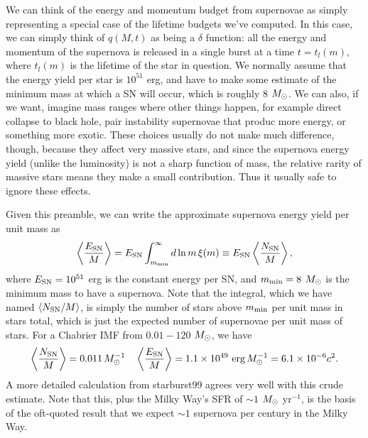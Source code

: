 We can think of the energy and momentum budget from supernovae as simply representing a special case of the lifetime budgets we've computed. In this case, we can simply think of $q(M,t)$ as being a $\delta$ function: all the energy and momentum of the supernova is released in a single burst at a time $t=t_l(m)$, where $t_l(m)$ is the lifetime of the star in question. We normally assume that the energy yield per star is $10^{51}$ erg, and have to make some estimate of the minimum mass at which a SN will occur, which is roughly 8 $M_{\odot}$. We can also, if we want, imagine mass ranges where other things happen, for example direct collapse to black hole, pair instability supernovae that produc more energy, or something more exotic. These choices usually do not make much difference, though, because they affect very massive stars, and since the supernova energy yield (unlike the luminosity) is not a sharp function of mass, the relative rarity of massive stars means they make a small contribution. Thus it usually safe to ignore these effects.

Given this preamble, we can write the approximate supernova energy yield per unit mass as
\begin{equation}
\left\langle \frac{E_{\rm SN}}{M}\right\rangle = E_{\rm SN} \int_{m_{\rm min}}^\infty d\ln m\, \xi(m) \equiv E_{\rm SN} \left\langle \frac{N_{\rm SN}}{M}\right\rangle,
\end{equation}
where $E_{\rm SN} = 10^{51}$ erg is the constant energy per SN, and $m_{\rm min} = 8$ $M_{\odot}$ is the minimum mass to have a supernova. Note that the integral, which we have named $\langle N_{\rm SN}/M\rangle$, is simply the number of stars above $m_{\rm min}$ per unit mass in stars total, which is just the expected number of supernovae per unit mass of stars. For a Chabrier IMF from $0.01-120$ $M_{\odot}$, we have
\begin{equation}
\left\langle \frac{N_{\rm SN}}{M}\right\rangle = 0.011\, M_{\odot}^{-1}
\quad
\left\langle \frac{E_{\rm SN}}{M}\right\rangle = 1.1\times 10^{49}\mbox{ erg}\,M_{\odot}^{-1}=6.1\times 10^{-6} c^2.
\end{equation}
A more detailed calculation from starburst99 agrees very well with this crude estimate. Note that this, plus the Milky Way's SFR of $\sim 1$ $M_{\odot}$ yr$^{-1}$, is the basis of the oft-quoted result that we expect $\sim 1$ supernova per century in the Milky Way.

